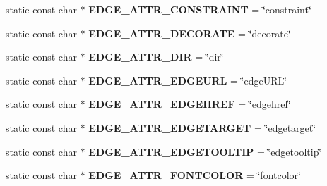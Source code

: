 \begin{DoxyCompactItemize}
\item 
static const char $\ast$ {\bfseries E\+D\+G\+E\+\_\+\+A\+T\+T\+R\+\_\+\+C\+O\+N\+S\+T\+R\+A\+I\+NT} = \char`\"{}constraint\char`\"{}\hypertarget{classmemgraph_1_1_graphviz_attrs_a36418bfd9f3e73cf139cf792b56aadb2}{}\label{classmemgraph_1_1_graphviz_attrs_a36418bfd9f3e73cf139cf792b56aadb2}

\item 
static const char $\ast$ {\bfseries E\+D\+G\+E\+\_\+\+A\+T\+T\+R\+\_\+\+D\+E\+C\+O\+R\+A\+TE} = \char`\"{}decorate\char`\"{}\hypertarget{classmemgraph_1_1_graphviz_attrs_ab52daa82304f99d028a807c113c4946a}{}\label{classmemgraph_1_1_graphviz_attrs_ab52daa82304f99d028a807c113c4946a}

\item 
static const char $\ast$ {\bfseries E\+D\+G\+E\+\_\+\+A\+T\+T\+R\+\_\+\+D\+IR} = \char`\"{}dir\char`\"{}\hypertarget{classmemgraph_1_1_graphviz_attrs_aeaedcf1ef8e4fbe540892bdfa72c534d}{}\label{classmemgraph_1_1_graphviz_attrs_aeaedcf1ef8e4fbe540892bdfa72c534d}

\item 
static const char $\ast$ {\bfseries E\+D\+G\+E\+\_\+\+A\+T\+T\+R\+\_\+\+E\+D\+G\+E\+U\+RL} = \char`\"{}edge\+U\+RL\char`\"{}\hypertarget{classmemgraph_1_1_graphviz_attrs_a4573a02b18de049ebf6094f70538d47b}{}\label{classmemgraph_1_1_graphviz_attrs_a4573a02b18de049ebf6094f70538d47b}

\item 
static const char $\ast$ {\bfseries E\+D\+G\+E\+\_\+\+A\+T\+T\+R\+\_\+\+E\+D\+G\+E\+H\+R\+EF} = \char`\"{}edgehref\char`\"{}\hypertarget{classmemgraph_1_1_graphviz_attrs_a5625b77a3f46adbe627049b3430bb6a3}{}\label{classmemgraph_1_1_graphviz_attrs_a5625b77a3f46adbe627049b3430bb6a3}

\item 
static const char $\ast$ {\bfseries E\+D\+G\+E\+\_\+\+A\+T\+T\+R\+\_\+\+E\+D\+G\+E\+T\+A\+R\+G\+ET} = \char`\"{}edgetarget\char`\"{}\hypertarget{classmemgraph_1_1_graphviz_attrs_a8940959030e03982794e41ab4dbfd4bf}{}\label{classmemgraph_1_1_graphviz_attrs_a8940959030e03982794e41ab4dbfd4bf}

\item 
static const char $\ast$ {\bfseries E\+D\+G\+E\+\_\+\+A\+T\+T\+R\+\_\+\+E\+D\+G\+E\+T\+O\+O\+L\+T\+IP} = \char`\"{}edgetooltip\char`\"{}\hypertarget{classmemgraph_1_1_graphviz_attrs_aa20fda0cb14cb7b9ac079c1bca59ef0c}{}\label{classmemgraph_1_1_graphviz_attrs_aa20fda0cb14cb7b9ac079c1bca59ef0c}

\item 
static const char $\ast$ {\bfseries E\+D\+G\+E\+\_\+\+A\+T\+T\+R\+\_\+\+F\+O\+N\+T\+C\+O\+L\+OR} = \char`\"{}fontcolor\char`\"{}\hypertarget{classmemgraph_1_1_graphviz_attrs_a804dd73a31cdf01fb3b2b7b4f13379bf}{}\label{classmemgraph_1_1_graphviz_attrs_a804dd73a31cdf01fb3b2b7b4f13379bf}


\end{DoxyCompactItemize}
